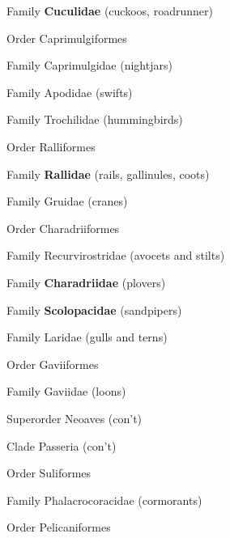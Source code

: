 \documentclass[10pt]{article}
\newlength\mylength
\newcommand*{\growparindent}{\addtolength{\parindent}{\mylength}}
\newcommand*{\reduceparindent}{\addtolength{\parindent}{-1\mylength}}
\begin{document}
\begin{spacing}{1.35}
    	  Family \textbf{Cuculidae} (cuckoos, roadrunner)
    	  
    	\reduceparindent
    	
    	Order Caprimulgiformes
    	
    		\growparindent
    		
    		Family Caprimulgidae (nightjars)
    		
    		Family Apodidae (swifts)
    		
    		Family Trochilidae (hummingbirds)
    		
    	\reduceparindent
    	
    	Order Ralliformes
    	
    	\growparindent
    	
    		Family \textbf{Rallidae} (rails, gallinules, coots)
    		
    		Family Gruidae (cranes)
    		
    	\reduceparindent
    	
    	Order Charadriiformes
    	
    		\growparindent
    		
    		Family Recurvirostridae (avocets and stilts)
    		
    		Family \textbf{Charadriidae} (plovers)
    		
    		Family \textbf{Scolopacidae} (sandpipers)
    		
    		Family Laridae (gulls and terns)
    		
    	\reduceparindent
    	
    	Order Gaviiformes
    	
    		\growparindent
    		
    		Family Gaviidae (loons)
      
\reduceparindent  \newpage
      
	\reduceparindent
      
	Superorder Neoaves (con't)
      
	\growparindent
      
    Clade Passeria (con't)
      
      \growparindent
      
      Order Suliformes
      
      	\growparindent
      
      	Family Phalacrocoracidae (cormorants)
      	
      \reduceparindent
      
      Order Pelicaniformes
      

\end{spacing}
\end{document}
